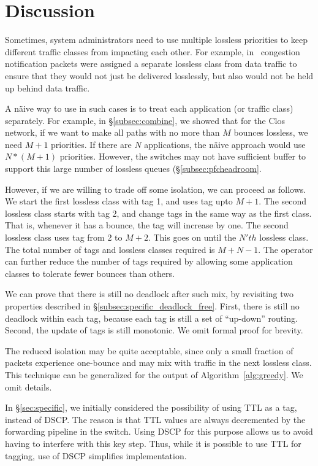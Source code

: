 \section{Discussion}

 Sometimes, system administrators need to
use multiple lossless priorities to keep different traffic classes from impacting each
other. For example, in~\cite{dcqcn} congestion notification packets were
assigned a separate lossless class from data traffic to ensure that they would
not just be delivered losslessly, but also would not be held up behind data
traffic.

A n{\"a}ive way to use \sysname{} in such cases is to treat each application (or
traffic class) separately.  For example, in \S\ref{subsec:combine}, we showed
that for the Clos network, if we want to make  all paths with no more than $M$
bounces lossless, we need $M+1$ priorities. If there are $N$ applications, the
n{\"a}ive approach would use $N*(M+1)$ priorities.  However, the switches may
not have sufficient buffer to support this large number of lossless queues
(\S\ref{subsec:pfcheadroom}.

However, if we are willing to trade off some isolation, we can proceed as
follows.  We start the first lossless class with tag 1, and uses tag upto $M+1$.
The second lossless class starts with tag 2, and change tags in the same way as
the first class.  That is, whenever it has a bounce, the tag will increase by
one. The second lossless class uses tag from 2 to $M+2$. This goes on until the
$N'th$ lossless class. The total number of tags and lossless classes required is
$M + N -1$. The operator can further reduce the number of tags required by allowing
some application classes to tolerate fewer bounces than others.

We can prove that there is still no deadlock after such mix, by revisiting two
properties described in \S\ref{subsec:specific_deadlock_free}. First, there is
still no deadlock within each tag, because each tag is still a set of
``up-down'' routing. Second, the update of tags is still monotonic. We omit
formal proof for brevity.

The reduced isolation may be quite acceptable, since only a small fraction of
packets experience one-bounce and may mix with traffic in the next lossless
class.  This technique can be generalized for the output of
Algorithm~\ref{alg:greedy}.  We omit details.

 In \S\ref{sec:specific}, we initially
considered the possibility of using TTL as a tag, instead of DSCP. The reason is
that TTL values are always decremented by the forwarding pipeline in the switch.
Using DSCP for this purpose allows us to avoid having to interfere with this key
step. Thus, while it is possible to use TTL for tagging, use of DSCP simplifies
implementation.

